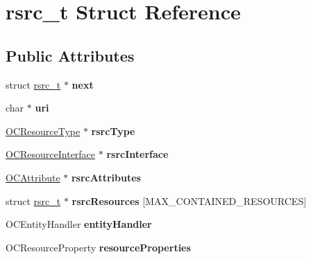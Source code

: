 \hypertarget{structrsrc__t}{}\section{rsrc\+\_\+t Struct Reference}
\label{structrsrc__t}
\subsection*{Public Attributes}
\begin{DoxyCompactItemize}
\item 
\hypertarget{structrsrc__t_a89de056f8a202e5d8532912c994e9ae9}{}struct \hyperlink{structrsrc__t}{rsrc\+\_\+t} $\ast$ {\bfseries next}\label{structrsrc__t_a89de056f8a202e5d8532912c994e9ae9}

\item 
\hypertarget{structrsrc__t_ae09c301613d3d764982e38bcbecdcd1a}{}char $\ast$ {\bfseries uri}\label{structrsrc__t_ae09c301613d3d764982e38bcbecdcd1a}

\item 
\hypertarget{structrsrc__t_ae09b6da3f80e4433853aac844723c1eb}{}\hyperlink{structresourcetype__t}{O\+C\+Resource\+Type} $\ast$ {\bfseries rsrc\+Type}\label{structrsrc__t_ae09b6da3f80e4433853aac844723c1eb}

\item 
\hypertarget{structrsrc__t_a84cc8a9e53c0991c02b4b68ac561e35e}{}\hyperlink{structresourceinterface__t}{O\+C\+Resource\+Interface} $\ast$ {\bfseries rsrc\+Interface}\label{structrsrc__t_a84cc8a9e53c0991c02b4b68ac561e35e}

\item 
\hypertarget{structrsrc__t_a802e43f609589a594397cfe363d919fa}{}\hyperlink{structattr__t}{O\+C\+Attribute} $\ast$ {\bfseries rsrc\+Attributes}\label{structrsrc__t_a802e43f609589a594397cfe363d919fa}

\item 
\hypertarget{structrsrc__t_aee3db0dc8643e092582b81b08a539278}{}struct \hyperlink{structrsrc__t}{rsrc\+\_\+t} $\ast$ {\bfseries rsrc\+Resources} \mbox{[}M\+A\+X\+\_\+\+C\+O\+N\+T\+A\+I\+N\+E\+D\+\_\+\+R\+E\+S\+O\+U\+R\+C\+E\+S\mbox{]}\label{structrsrc__t_aee3db0dc8643e092582b81b08a539278}

\item 
\hypertarget{structrsrc__t_adcbad2d4ea1d1e614e6b707f2768f936}{}O\+C\+Entity\+Handler {\bfseries entity\+Handler}\label{structrsrc__t_adcbad2d4ea1d1e614e6b707f2768f936}

\item 
\hypertarget{structrsrc__t_ab3e3470aff17c3fddcd7a29835e0bece}{}O\+C\+Resource\+Property {\bfseries resource\+Properties}\label{structrsrc__t_ab3e3470aff17c3fddcd7a29835e0bece}


\end{DoxyCompactItemize}
